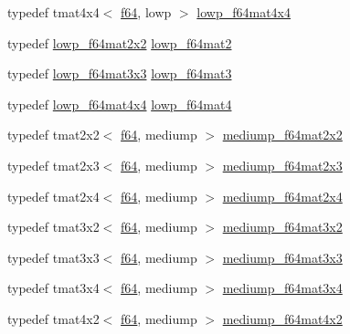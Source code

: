 \begin{DoxyCompactItemize}
\item 
typedef tmat4x4$<$ \hyperlink{group__gtc__type__precision_ga2bba392e555124b36cde6abba349bab3}{f64}, lowp $>$ \hyperlink{namespaceglm_a320b6621208d57155bc97ad404f3e584}{lowp\+\_\+f64mat4x4}
\item 
typedef \hyperlink{namespaceglm_aa0842065affce367ff31e0d9af433c3d}{lowp\+\_\+f64mat2x2} \hyperlink{namespaceglm_a2984b3b0b6ee0657044d186bb875b4e3}{lowp\+\_\+f64mat2}
\item 
typedef \hyperlink{namespaceglm_a6367c3751539aea4009d60450f059189}{lowp\+\_\+f64mat3x3} \hyperlink{namespaceglm_a4acbda53fb7ff9568c0a2786fad450b8}{lowp\+\_\+f64mat3}
\item 
typedef \hyperlink{namespaceglm_a320b6621208d57155bc97ad404f3e584}{lowp\+\_\+f64mat4x4} \hyperlink{namespaceglm_a4378d9384f1b24848043ccb02dcf2959}{lowp\+\_\+f64mat4}
\item 
typedef tmat2x2$<$ \hyperlink{group__gtc__type__precision_ga2bba392e555124b36cde6abba349bab3}{f64}, mediump $>$ \hyperlink{namespaceglm_adc818b8045259f2f2e33e735a9737dae}{mediump\+\_\+f64mat2x2}
\item 
typedef tmat2x3$<$ \hyperlink{group__gtc__type__precision_ga2bba392e555124b36cde6abba349bab3}{f64}, mediump $>$ \hyperlink{namespaceglm_aaf979f3ea10f65ed657dc512a4600991}{mediump\+\_\+f64mat2x3}
\item 
typedef tmat2x4$<$ \hyperlink{group__gtc__type__precision_ga2bba392e555124b36cde6abba349bab3}{f64}, mediump $>$ \hyperlink{namespaceglm_a75a8c4227dfbe2587b940e623aa3f9c1}{mediump\+\_\+f64mat2x4}
\item 
typedef tmat3x2$<$ \hyperlink{group__gtc__type__precision_ga2bba392e555124b36cde6abba349bab3}{f64}, mediump $>$ \hyperlink{namespaceglm_a3f8509c2b3d9918ae271af16e5b7a8a2}{mediump\+\_\+f64mat3x2}
\item 
typedef tmat3x3$<$ \hyperlink{group__gtc__type__precision_ga2bba392e555124b36cde6abba349bab3}{f64}, mediump $>$ \hyperlink{namespaceglm_a22041536da675c1b971deb0d6ca0bba9}{mediump\+\_\+f64mat3x3}
\item 
typedef tmat3x4$<$ \hyperlink{group__gtc__type__precision_ga2bba392e555124b36cde6abba349bab3}{f64}, mediump $>$ \hyperlink{namespaceglm_ae0921fdf0249dd34fcb0ccae9c77828b}{mediump\+\_\+f64mat3x4}
\item 
typedef tmat4x2$<$ \hyperlink{group__gtc__type__precision_ga2bba392e555124b36cde6abba349bab3}{f64}, mediump $>$ \hyperlink{namespaceglm_ac6276267e7175f213a268d67af678713}{mediump\+\_\+f64mat4x2}
\item 

\end{DoxyCompactItemize}
